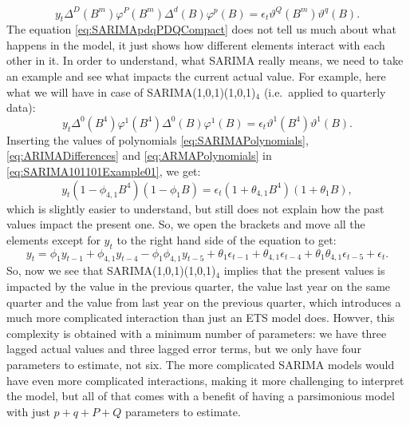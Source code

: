 \documentclass[
]{book}
\theoremstyle{definition}
\theoremstyle{definition}
\theoremstyle{definition}
\theoremstyle{definition}
\theoremstyle{remark}
\begin{document}
\begin{equation}
  y_t \Delta^D(B^m) \varphi^P(B^m) \Delta^d(B) \varphi^p(B) = \epsilon_t \vartheta^Q(B^m) \vartheta^q(B) .
  \label{eq:SARIMApdqPDQCompact}
\end{equation}
The equation \eqref{eq:SARIMApdqPDQCompact} does not tell us much about what happens in the model, it just shows how different elements interact with each other in it. In order to understand, what SARIMA really means, we need to take an example and see what impacts the current actual value. For example, here what we will have in case of SARIMA(1,0,1)(1,0,1)\(_4\) (i.e.~applied to quarterly data):
\begin{equation}
  y_t \Delta^0(B^4) \varphi^1(B^4) \Delta^0(B) \varphi^1(B) = \epsilon_t \vartheta^1(B^4) \vartheta^1(B) .
  \label{eq:SARIMA101101Example01}
\end{equation}
Inserting the values of polynomials \eqref{eq:SARIMAPolynomials}, \eqref{eq:ARIMADifferences} and \eqref{eq:ARMAPolynomials} in \eqref{eq:SARIMA101101Example01}, we get:
\begin{equation}
  y_t (1 - \phi_{4,1} B^4)(1 - \phi_{1} B) = \epsilon_t (1 + \theta_{4,1} B^4) (1 + \theta_{1} B),
  \label{eq:SARIMA101101Example02}
\end{equation}
which is slightly easier to understand, but still does not explain how the past values impact the present one. So, we open the brackets and move all the elements except for \(y_t\) to the right hand side of the equation to get:
\begin{equation}
  y_t = \phi_{1} y_{t-1} + \phi_{4,1} y_{t-4} - \phi_{1} \phi_{4,1} y_{t-5} + \theta_1 \epsilon_{t-1} + \theta_{4,1} \epsilon_{t-4} + \theta_{1} \theta_{4,1} \epsilon_{t-5} + \epsilon_t .
  \label{eq:SARIMA101101Example03}
\end{equation}
So, now we see that SARIMA(1,0,1)(1,0,1)\(_4\) implies that the present values is impacted by the value in the previous quarter, the value last year on the same quarter and the value from last year on the previous quarter, which introduces a much more complicated interaction than just an ETS model does. Howver, this complexity is obtained with a minimum number of parameters: we have three lagged actual values and three lagged error terms, but we only have four parameters to estimate, not six. The more complicated SARIMA models would have even more complicated interactions, making it more challenging to interpret the model, but all of that comes with a benefit of having a parsimonious model with just \(p+q+P+Q\) parameters to estimate.
\end{document}
